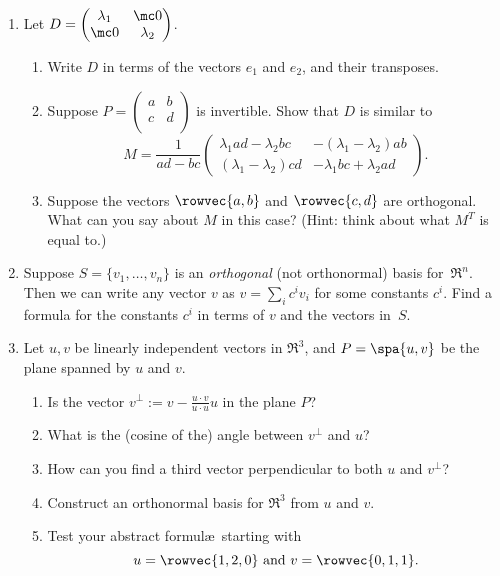 


\begin{enumerate}

\item Let $D=\begin{pmatrix}
\lambda_1 & \mc0 \\
\mc0 & \lambda_2 \\
\end{pmatrix}$.
\begin{enumerate}
\item Write $D$ in terms of the vectors $e_1$ and $e_2$, and their transposes.
\item Suppose $P=\begin{pmatrix}
a & b \\
c & d \\
\end{pmatrix}$ is invertible.  Show that $D$ is similar to
\[
M=\frac{1}{ad-bc}\begin{pmatrix}
\lambda_1ad-\lambda_2bc & -(\lambda_1-\lambda_2)ab \\[1mm]
(\lambda_1-\lambda_2)cd & -\lambda_1bc + \lambda_2ad
\end{pmatrix}.
\]
\item Suppose the vectors $\rowvec{a,b}$ and $\rowvec{c,d}$ are orthogonal.  What can you say about $M$ in this case? (Hint: think about what \(M^T\) is equal to.)
\end{enumerate}


\item \label{orthogprob} Suppose $S=\{v_1, \ldots, v_n \}$ is an \emph{orthogonal} (not orthonormal) basis for~$\Re^n$.  Then we can write any vector $v$ as $v=\sum_ic^iv_i$ for some constants $c^i$.  Find a formula for the constants $c^i$ in terms of $v$ and the vectors in~$S$.


\item \label{orthogprojprob} Let $u,v$ be linearly independent vectors in $\Re^3$, and $P=\spa \{ u,v\}$ be the plane spanned by $u$ and $v$.  
\begin{enumerate}
\item Is the vector $v^\bot := v-\frac{u\cdot v}{u\cdot u}u$ in the plane $P$?
\item  What is the (cosine of the) angle between $v^\bot$ and $u$?
\item %
How can you find a third vector perpendicular to both $u$ and $v^\bot$?
\item  Construct an orthonormal basis for $\Re^3$ from $u$ and $v$.
\item  Test your abstract formul\ae\ starting with 
\[
u=\rowvec{1 , 2 , 0} \text{ and } v=\rowvec{0 , 1 , 1}.
\]
\end{enumerate}


\end{enumerate}
